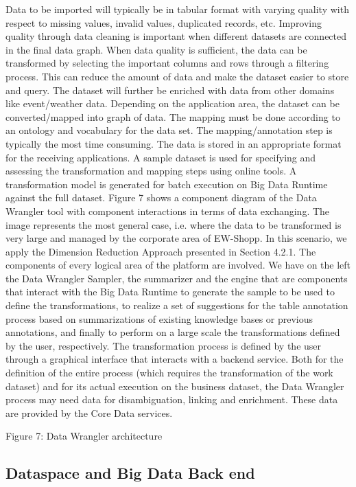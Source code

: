 Data to be imported will typically be in tabular format with varying quality with respect to missing values, invalid values, duplicated records, etc. Improving quality through data cleaning is important when different datasets are connected in the final data graph. When data quality is sufficient, the data can be transformed by selecting the important columns and rows through a filtering process. This can reduce the amount of data and make the dataset easier to store and query. The dataset will further be enriched with data from other domains like event/weather data. Depending on the application area, the dataset can be converted/mapped into graph of data. The mapping must be done according to an ontology and vocabulary for the data set. The mapping/annotation step is typically the most time consuming. The data is stored in an appropriate format for the receiving applications. A sample dataset is used for specifying and assessing the transformation and mapping steps using online tools. A transformation model is generated for batch execution on Big Data Runtime against the full dataset. 
Figure 7 shows a component diagram of the Data Wrangler tool with component interactions in terms of data exchanging. The image represents the most general case, i.e. where the data to be transformed is very large and managed by the corporate area of EW-Shopp. In this scenario, we apply the Dimension Reduction Approach presented in Section 4.2.1. The components of every logical area of the platform are involved. We have on the left the Data Wrangler Sampler, the summarizer and the engine that are components that interact with the Big Data Runtime to generate the sample to be used to define the transformations, to realize a set of suggestions for the table annotation process based on summarizations of existing knowledge bases or previous annotations, and finally to perform on a large scale the transformations defined by the user, respectively. The transformation process is defined by the user through a graphical interface that interacts with a backend service.
Both for the definition of the entire process (which requires the transformation of the work dataset) and for its actual execution on the business dataset, the Data Wrangler process may need data for disambiguation, linking and enrichment. These data are provided by the Core Data services.
 
Figure 7: Data Wrangler architecture




\subsection{Dataspace and Big Data Back end}
